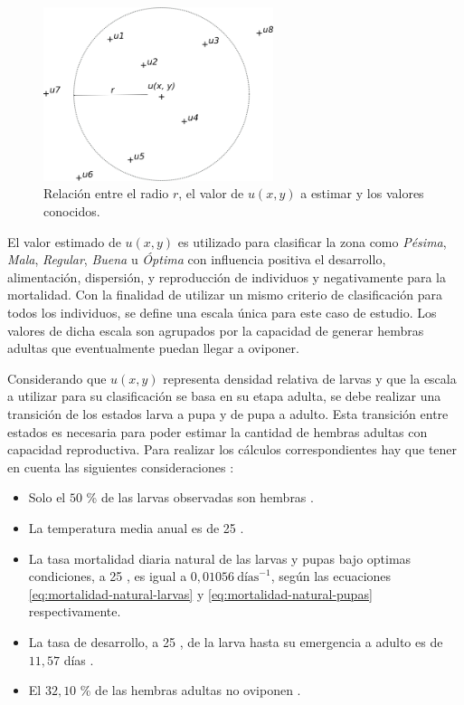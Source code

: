 \begin{figure}[!hptb]
\centering
\includegraphics[width=0.6\textwidth]{capitulo-4/graphics/zonificacion.png}
\caption{\label{fig:cap4-zonficiacion} Relación entre el radio $r$, el valor de $u(x,y)$ a estimar y los valores conocidos.}
\end{figure}

El valor estimado de $u(x,y)$ es utilizado para clasificar la zona como \textit{Pésima},
\textit{Mala}, \textit{Regular}, \textit{Buena} u \textit{Óptima} con influencia positiva el
desarrollo, alimentación, dispersión, y reproducción de individuos y negativamente para la
mortalidad. Con la finalidad de utilizar un mismo criterio de clasificación para todos los
individuos, se define una escala única para este caso de estudio. Los valores de dicha escala son
agrupados por la capacidad de generar hembras adultas que eventualmente puedan llegar a oviponer.

Considerando que $u(x,y)$ representa densidad relativa de larvas y que la escala a utilizar
para su clasificación se basa en su etapa adulta, se debe realizar una transición de los estados
larva a pupa y de pupa a adulto. Esta transición entre estados es necesaria para poder estimar la
cantidad de hembras adultas con capacidad reproductiva. Para realizar los cálculos
correspondientes hay que tener en cuenta las siguientes consideraciones :

\begin{itemize}
    \item Solo el $50$ \% de las larvas observadas son hembras \cite{otero2006stochastic, manrique1998desarrollo}.
    \item La temperatura media anual es de 25 \textcelsius \cite{website:mspbsHistoria2014}.
    \item La tasa mortalidad diaria natural de las larvas y pupas bajo optimas condiciones, a 25 \textcelsius, es igual a $0,01056\ \text{días}^{-1}$, según las ecuaciones \eqref{eq:mortalidad-natural-larvas} y \eqref{eq:mortalidad-natural-pupas} respectivamente.
    \item La tasa de desarrollo, a 25 \textcelsius, de la larva hasta su emergencia a adulto es de $11,57$ días \cite{rueda1990temperature}.
    \item El $32,10$ \% de las hembras adultas no oviponen \cite{osoriopontificia}.
\end{itemize}


